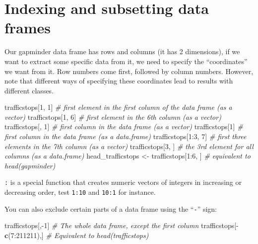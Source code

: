 \documentclass[]{book}
\newenvironment{Shaded}{\begin{snugshade}}{\end{snugshade}}
\newcommand{\KeywordTok}[1]{\textcolor[rgb]{0.13,0.29,0.53}{\textbf{{#1}}}}
\newcommand{\DecValTok}[1]{\textcolor[rgb]{0.00,0.00,0.81}{{#1}}}
\newcommand{\StringTok}[1]{\textcolor[rgb]{0.31,0.60,0.02}{{#1}}}
\newcommand{\CommentTok}[1]{\textcolor[rgb]{0.56,0.35,0.01}{\textit{{#1}}}}
\newcommand{\NormalTok}[1]{{#1}}
\theoremstyle{definition}
\theoremstyle{definition}
\theoremstyle{remark}
\begin{document}
\section{Indexing and subsetting data
frames}\label{indexing-and-subsetting-data-frames}

Our gapminder data frame has rows and columns (it has 2 dimensions), if
we want to extract some specific data from it, we need to specify the
``coordinates'' we want from it. Row numbers come first, followed by
column numbers. However, note that different ways of specifying these
coordinates lead to results with different classes.

\begin{Shaded}
\begin{Highlighting}[]
\NormalTok{trafficstops[}\DecValTok{1}\NormalTok{, }\DecValTok{1}\NormalTok{]   }\CommentTok{# first element in the first column of the data frame (as a vector)}
\NormalTok{trafficstops[}\DecValTok{1}\NormalTok{, }\DecValTok{6}\NormalTok{]   }\CommentTok{# first element in the 6th column (as a vector)}
\NormalTok{trafficstops[, }\DecValTok{1}\NormalTok{]    }\CommentTok{# first column in the data frame (as a vector)}
\NormalTok{trafficstops[}\DecValTok{1}\NormalTok{]      }\CommentTok{# first column in the data frame (as a data.frame)}
\NormalTok{trafficstops[}\DecValTok{1}\NormalTok{:}\DecValTok{3}\NormalTok{, }\DecValTok{7}\NormalTok{] }\CommentTok{# first three elements in the 7th column (as a vector)}
\NormalTok{trafficstops[}\DecValTok{3}\NormalTok{, ]    }\CommentTok{# the 3rd element for all columns (as a data.frame)}
\NormalTok{head_trafficstops <-}\StringTok{ }\NormalTok{trafficstops[}\DecValTok{1}\NormalTok{:}\DecValTok{6}\NormalTok{, ] }\CommentTok{# equivalent to head(gapminder)}
\end{Highlighting}
\end{Shaded}

\texttt{:} is a special function that creates numeric vectors of
integers in increasing or decreasing order, test \texttt{1:10} and
\texttt{10:1} for instance.

You can also exclude certain parts of a data frame using the
``\texttt{-}'' sign:

\begin{Shaded}
\begin{Highlighting}[]
\NormalTok{trafficstops[,-}\DecValTok{1}\NormalTok{]          }\CommentTok{# The whole data frame, except the first column}
\NormalTok{trafficstops[-}\KeywordTok{c}\NormalTok{(}\DecValTok{7}\NormalTok{:}\DecValTok{211211}\NormalTok{),] }\CommentTok{# Equivalent to head(trafficstops)}
\end{Highlighting}
\end{Shaded}
\end{document}
